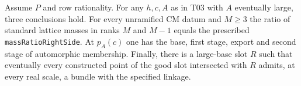 \begin{formalstatement}\label{sub:T06}

Assume $P$ and row rationality. For any $h,c,A$ as in T03 with $A$
eventually large, three conclusions hold. For every unramified CM datum and
$M\ge3$ the ratio of standard lattice masses in ranks $M$ and $M-1$ equals
the prescribed \nolinkurl{massRatioRightSide}. At $p_A(c)$ one has the base,
first stage, export and second stage of automorphic membership. Finally, there
is a large-base slot $R$ such that eventually every constructed point of
the good slot intersected with $R$ admits, at every real scale, a bundle
with the specified linkage.

\end{formalstatement}
